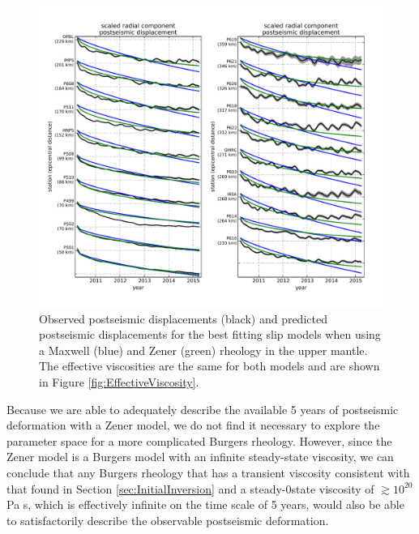 \documentclass[review]{elsarticle}
\begin{document}
\begin{figure}
\includegraphics[scale=0.8]{Figures/RecordSectionFinal}
\centering 
\caption{Observed postseismic displacements (black) and predicted postseismic displacements for the best fitting slip models when using a Maxwell (blue) and Zener (green) rheology in the upper mantle.  The effective viscosities are the same for both models and are shown in Figure \ref{fig:EffectiveViscosity}.}
\label{fig:RecordSection2}
\end{figure} 

Because we are able to adequately describe the available 5 years of postseismic deformation with a Zener model, we do not find it necessary to explore the parameter space for a more complicated Burgers rheology.  However, since the Zener model is a Burgers model with an infinite steady-state viscosity, we can conclude that any Burgers rheology that has a transient viscosity consistent with that found in Section \ref{sec:InitialInversion} and a steady-0state viscosity of $\gtrsim10^{20}$ Pa s, which is effectively infinite on the time scale of 5 years, would also be able to satisfactorily describe the observable postseismic deformation.        
  
\end{document}
